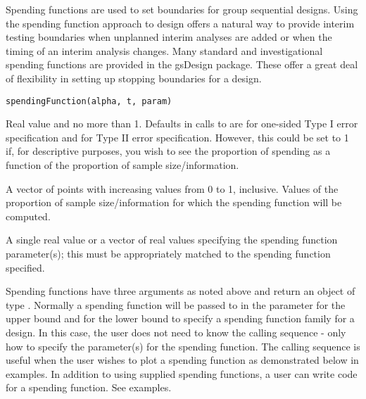 \begin{Description}\relax
Spending functions are used to set boundaries for group sequential designs.
Using the spending function approach to design offers a natural way to provide interim testing boundaries
when unplanned interim analyses are added or when the timing of an interim analysis changes.
Many standard and investigational spending functions are provided in the gsDesign package.
These offer a great deal of flexibility in setting up stopping boundaries for a design.
\end{Description}
\begin{Usage}
\begin{verbatim}
spendingFunction(alpha, t, param)
\end{verbatim}
\end{Usage}
\begin{Arguments}
\begin{ldescription}
\item[\code{alpha}] Real value  and no more than 1. Defaults in calls to  are 
 for one-sided Type I error specification and 
 for Type II error specification. 
However, this could be set to 1 if, for descriptive purposes,
you wish to see the proportion of spending as a function of the proportion of sample size/information.
\item[\code{t}] A vector of points with increasing values from 0 to 1, inclusive. Values of the proportion of 
sample size/information for which the spending function will be computed.
\item[\code{param}] A single real value or a vector of real values specifying the spending function parameter(s); 
this must be appropriately matched to the spending function specified.
\end{ldescription}
\end{Arguments}
\begin{Details}\relax
Spending functions have three arguments as noted above and return an object of type .
Normally a spending function will be passed to  in the parameter  for the upper bound and
 for the lower bound to specify a spending function family for a design.
In this case, the user does not need to know the calling sequence - only how to specify the parameter(s) for the
spending function.
The calling sequence is useful when the user wishes to plot a spending function as demonstrated below
in examples.
In addition to using supplied spending functions, a user can write code for a spending function.
See examples.
\end{Details}
